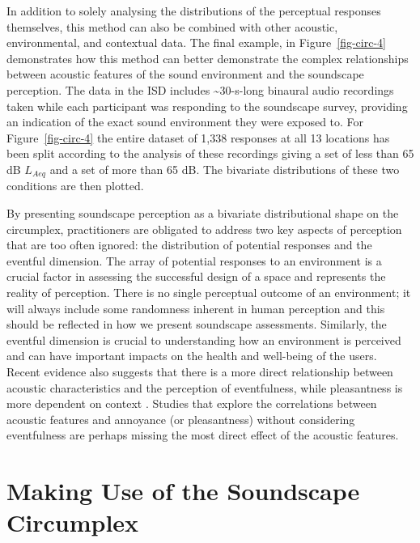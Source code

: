 \documentclass[
  authoryear,
  preprint,
  3p]{elsarticle}
\begin{document}
In addition to solely analysing the distributions of the perceptual
responses themselves, this method can also be combined with other
acoustic, environmental, and contextual data. The final example, in
Figure~\ref{fig-circ-4} demonstrates how this method can better
demonstrate the complex relationships between acoustic features of the
sound environment and the soundscape perception. The data in the ISD
includes \textasciitilde30-s-long binaural audio recordings taken while
each participant was responding to the soundscape survey, providing an
indication of the exact sound environment they were exposed to. For
Figure~\ref{fig-circ-4} the entire dataset of 1,338 responses at all 13
locations has been split according to the analysis of these recordings
giving a set of less than 65 dB \(L_{Aeq}\) and a set of more than 65
dB. The bivariate distributions of these two conditions are then
plotted.

By presenting soundscape perception as a bivariate distributional shape
on the circumplex, practitioners are obligated to address two key
aspects of perception that are too often ignored: the distribution of
potential responses and the eventful dimension. The array of potential
responses to an environment is a crucial factor in assessing the
successful design of a space and represents the reality of perception.
There is no single perceptual outcome of an environment; it will always
include some randomness inherent in human perception and this should be
reflected in how we present soundscape assessments. Similarly, the
eventful dimension is crucial to understanding how an environment is
perceived and can have important impacts on the health and well-being of
the users. Recent evidence also suggests that there is a more direct
relationship between acoustic characteristics and the perception of
eventfulness, while pleasantness is more dependent on context
\citep{Mitchell2021Investigating}. Studies that explore the correlations
between acoustic features and annoyance (or pleasantness) without
considering eventfulness are perhaps missing the most direct effect of
the acoustic features.

\section{Making Use of the Soundscape
Circumplex}\label{making-use-of-the-soundscape-circumplex}
\end{document}
